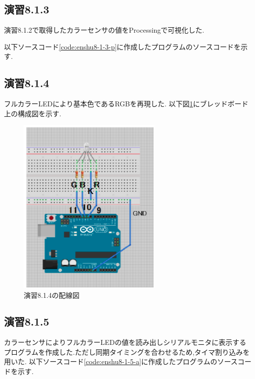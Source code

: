 \documentclass{jarticle}
\begin{document}
\subsection{演習8.1.3}
演習8.1.2で取得したカラーセンサの値をProcessingで可視化した.

以下ソースコード\ref{code:enshu8-1-3-p}に作成したプログラムのソースコードを示す.



\subsection{演習8.1.4}
フルカラーLEDにより基本色であるRGBを再現した.
以下図\ref{fig:enshu8-1-4}にブレッドボード上の構成図を示す.

\begin{figure}[H]
\begin{center}
\includegraphics[width=7.0cm]{images/enshu8-1-4.png}
\caption{演習8.1.4の配線図}
\label{fig:enshu8-1-4}
\end{center}
\end{figure}

\subsection{演習8.1.5}
カラーセンサによりフルカラーLEDの値を読み出しシリアルモニタに表示するプログラムを作成した.ただし同期タイミングを合わせるため,タイマ割り込みを用いた.
以下ソースコード\ref{code:enshu8-1-5-a}に作成したプログラムのソースコードを示す.


\end{document}
